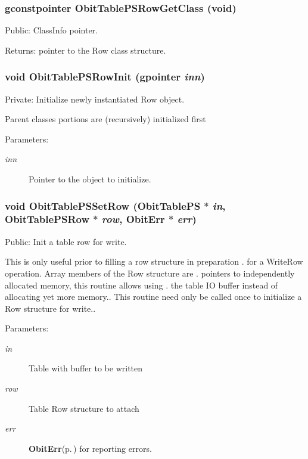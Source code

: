 \subsubsection{\setlength{\rightskip}{0pt plus 5cm}gconstpointer Obit\-Table\-PSRow\-Get\-Class (void)}\label{ObitTablePS_8c_a15}


Public: Class\-Info pointer. 

\begin{Desc}
\item[Returns:]pointer to the Row class structure. \end{Desc}
\subsubsection{\setlength{\rightskip}{0pt plus 5cm}void Obit\-Table\-PSRow\-Init (gpointer {\em inn})}\label{ObitTablePS_8c_a6}


Private: Initialize newly instantiated Row object. 

Parent classes portions are (recursively) initialized first \begin{Desc}
\item[Parameters:]
\begin{description}
\item[{\em inn}]Pointer to the object to initialize. \end{description}
\end{Desc}
\subsubsection{\setlength{\rightskip}{0pt plus 5cm}void Obit\-Table\-PSSet\-Row ({\bf Obit\-Table\-PS} $\ast$ {\em in}, {\bf Obit\-Table\-PSRow} $\ast$ {\em row}, {\bf Obit\-Err} $\ast$ {\em err})}\label{ObitTablePS_8c_a23}


Public: Init a table row for write. 

This is only useful prior to filling a row structure in preparation . for a Write\-Row operation. Array members of the Row structure are . pointers to independently allocated memory, this routine allows using . the table IO buffer instead of allocating yet more memory.. This routine need only be called once to initialize a Row structure for write.. \begin{Desc}
\item[Parameters:]
\begin{description}
\item[{\em in}]Table with buffer to be written \item[{\em row}]Table Row structure to attach \item[{\em err}]{\bf Obit\-Err}{\rm (p.\,\pageref{structObitErr})} for reporting errors. \end{description}
\end{Desc}
